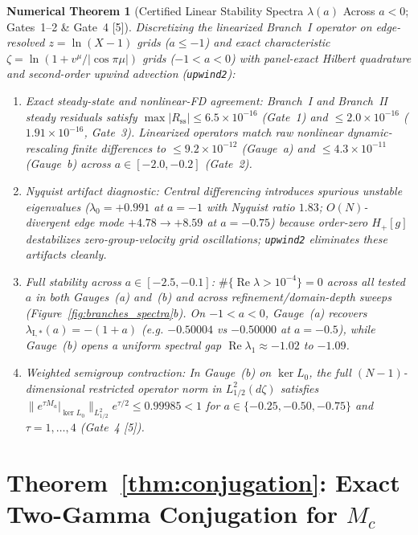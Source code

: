 \documentclass[11pt,a4paper]{article}
\newtheorem{numthm}{Numerical Theorem}
\begin{document}
\begin{numthm}[Certified Linear Stability Spectra $\lambda(a)$ Across $a < 0$; Gates~1--2 \& Gate~4 {[5]}]\label{numthm:spectra}
Discretizing the linearized Branch~I operator on edge-resolved $z = \ln(X-1)$ grids ($a \le -1$) and exact characteristic $\zeta = \ln(1 + v^\mu/|\cos\pi\mu|)$ grids ($-1 < a < 0$) with panel-exact Hilbert quadrature and second-order upwind advection (\texttt{upwind2}):
\begin{enumerate}
  \item \emph{Exact steady-state and nonlinear-FD agreement:} Branch~I and Branch~II steady residuals satisfy $\max|R_{\mathrm{ss}}| \le 6.5\times 10^{-16}$ (Gate~1) and $\le 2.0\times 10^{-16}$ ($1.91\times 10^{-16}$, Gate~3). Linearized operators match raw nonlinear dynamic-rescaling finite differences to $\le 9.2\times 10^{-12}$ (Gauge~a) and $\le 4.3\times 10^{-11}$ (Gauge~b) across $a \in [-2.0,-0.2]$ (Gate~2).
  \item \emph{Nyquist artifact diagnostic:} Central differencing introduces spurious unstable eigenvalues ($\lambda_0 = +0.991$ at $a=-1$ with Nyquist ratio $1.83$; $O(N)$-divergent edge mode $+4.78 \to +8.59$ at $a=-0.75$) because order-zero $H_+[g]$ destabilizes zero-group-velocity grid oscillations; \texttt{upwind2} eliminates these artifacts cleanly.
  \item \emph{Full stability across $a \in [-2.5, -0.1]$:} $\#\{\operatorname{Re}\lambda > 10^{-4}\} = 0$ across all tested $a$ in both Gauges~(a) and~(b) and across refinement/domain-depth sweeps (Figure~\ref{fig:branches_spectra}b). On $-1 < a < 0$, Gauge~(a) recovers $\lambda_{\mathrm{I},*}(a) = -(1+a)$ (e.g. $-0.50004$ vs $-0.50000$ at $a=-0.5$), while Gauge~(b) opens a uniform spectral gap $\operatorname{Re}\lambda_1 \approx -1.02$ to $-1.09$.
  \item \emph{Weighted semigroup contraction:} In Gauge~(b) on $\ker L_0$, the full $(N-1)$-dimensional restricted operator norm in $L^2_{1/2}(d\zeta)$ satisfies $\|e^{\tau M_a}|_{\ker L_0}\|_{L^2_{1/2}} e^{\tau/2} \le 0.99985 < 1$ for $a \in \{-0.25, -0.50, -0.75\}$ and $\tau = 1,\dots,4$ (Gate~4 {[5]}).
\end{enumerate}
\end{numthm}

\section{Theorem~\ref{thm:conjugation}: Exact Two-Gamma Conjugation for \texorpdfstring{$M_c$}{Mc}}\label{sec:thm1}
\end{document}
